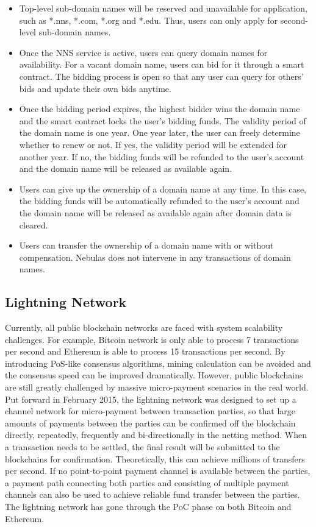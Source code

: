 \begin{itemize}

	\item Top-level sub-domain names will be reserved and unavailable for application, such as *.nns, *.com, *.org and *.edu. Thus, users can only apply for second-level sub-domain names.
	\item Once the NNS service is active, users can query domain names for availability. For a vacant domain name, users can bid for it through a smart contract. The bidding process is open so that any user can query for others' bids and update their own bids anytime.
	\item Once the bidding period expires, the highest bidder wins the domain name and the smart contract locks the user's bidding funds. The validity period of the domain name is one year. One year later, the user can freely determine whether to renew or not. If yes, the validity period will be extended for another year. If no, the bidding funds will be refunded to the user's account and the domain name will be released as available again.
	\item Users can give up the ownership of a domain name at any time. In this case, the bidding funds will be automatically refunded to the user's account and the domain name will be released as available again after domain data is cleared.
	\item Users can transfer the ownership of a domain name with or without compensation. Nebulas does not intervene in any transactions of domain names.

\end{itemize}


\subsection{Lightning Network}

Currently, all public blockchain networks are faced with system scalability challenges. For example, Bitcoin network is only able to process 7 transactions per second and Ethereum is able to process 15 transactions per second. By introducing PoS-like consensus algorithms, mining calculation can be avoided and the consensus speed can be improved dramatically. However, public blockchains are still greatly challenged by massive micro-payment scenarios in the real world. Put forward in February 2015, the lightning network \cite{poon2015bitcoin} was designed to set up a channel network for micro-payment between transaction parties, so that large amounts of payments between the parties can be confirmed off the blockchain directly, repeatedly, frequently and bi-directionally in the netting method. When a transaction needs to be settled, the final result will be submitted to the blockchains for confirmation. Theoretically, this can achieve millions of transfers per second. If no point-to-point payment channel is available between the parties, a payment path connecting both parties and consisting of multiple payment channels can also be used to achieve reliable fund transfer between the parties. The lightning network has gone through the PoC phase on both Bitcoin and Ethereum.

